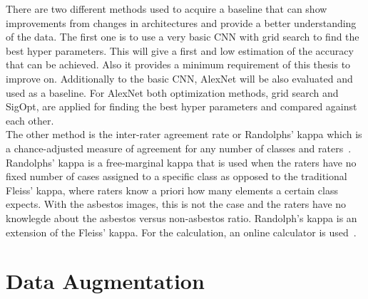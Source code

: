 There are two different methods used to acquire a baseline that can show improvements from changes in architectures and provide a better understanding of the data. The first one is to use a very basic CNN with grid search to find the best hyper parameters. This will give a first and low estimation of the accuracy that can be achieved. Also it provides a minimum requirement of this thesis to improve on. Additionally to the basic CNN, AlexNet will be also evaluated and used as a baseline. For AlexNet both optimization methods, grid search and SigOpt, are applied for finding the best hyper parameters and compared against each other.\\

The other method is the inter-rater agreement rate or Randolphs' kappa which is a chance-adjusted measure of agreement for any number of classes and raters~\cite{randolph2005free}. Randolphs' kappa is a free-marginal kappa that is used when the raters have no fixed number of cases assigned to a specific class as opposed to the traditional Fleiss' kappa, where raters know a priori how many elements a certain class expects. With the asbestos images, this is not the case and the raters have no knowlegde about the asbestos versus non-asbestos ratio. Randolph's kappa is an extension of the Fleiss' kappa. For the calculation, an online calculator is used~\cite{humanlevel2014}.

\section{Data Augmentation}

